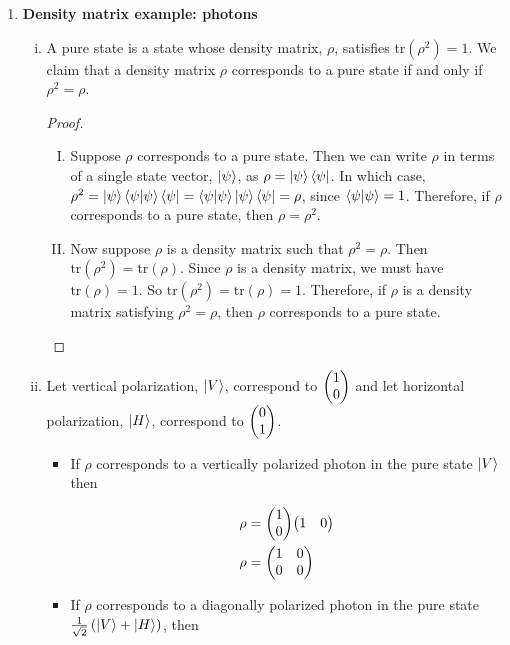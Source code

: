 \documentclass[]{article}
\begin{document}
\begin{enumerate}[1)]
\begin{enumerate}[i.]
\end{enumerate}
\item {\bf Density matrix example: photons}
\begin{enumerate}[i)]
\item A pure state is a state whose density matrix, $\rho$, satisfies $\text{tr}\left(\rho^2 \right)=1$. We claim that a density matrix $\rho$ corresponds to a pure state if and only if $\rho^2=\rho$. \\
\begin{proof} \hfill\\
\begin{enumerate}[I.]
\item Suppose $\rho$ corresponds to a pure state. Then we can write $\rho$ in terms of a single state vector, $\ket{\psi}$, as $\rho = \ket{\psi}\bra{\psi}$. In which case, $\rho^2 = \ket{\psi}\bra{\psi}\ket{\psi}\bra{\psi} = \bra{\psi}\ket{\psi}\ket{\psi}\bra{\psi} = \rho$, since $\bra{\psi}\ket{\psi} = 1$. Therefore, if $\rho$ corresponds to a pure state, then $\rho = \rho^2$. \\
\item Now suppose $\rho$ is a density matrix such that $\rho^2 = \rho$. Then $\text{tr}\left(\rho^2\right) = \text{tr}\left(\rho \right)$. Since $\rho$ is a density matrix, we must have $\text{tr}\left(\rho \right)=1$. So $\text{tr}\left(\rho^2\right) = \text{tr}\left(\rho \right)=1$. Therefore, if $\rho$ is a density matrix satisfying $\rho^2 = \rho$, then $\rho$ corresponds to a pure state. \\
\end{enumerate}
\end{proof}
\item Let vertical polarization, $\ket{V}$, correspond to $\mqty(1 \\ 0)$ and let horizontal polarization, $\ket{H}$, correspond to $\mqty(0 \\ 1)$. \\
\begin{itemize}
\item If $\rho$ corresponds to a vertically polarized photon in the pure state $\ket{V}$ then

\begin{equation}
\begin{split}
\rho & = \mqty(1 \\ 0)\mqty(1 & 0) \\ 
\rho & = \mqty(1  & 0 \\ 0 & 0) \\ 
\end{split}
\end{equation}
\item If $\rho$ corresponds to a diagonally polarized photon in the pure state $\frac{1}{\sqrt{2}}\left( \ket{V} + \ket{H}\right)$, then


\end{itemize}
\end{enumerate}
\end{enumerate}
\end{document}

